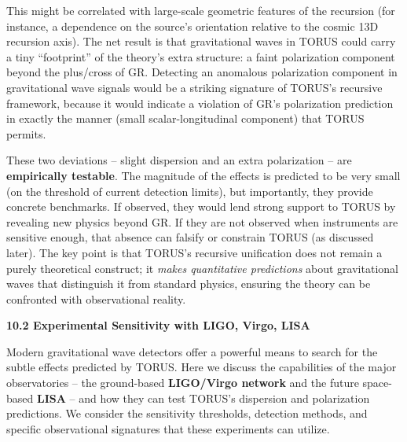 \documentclass[
]{article}
\begin{document}
{\begin{itemize}
  This might be correlated with large-scale geometric features of the
  recursion (for instance, a dependence on the source's orientation
  relative to the cosmic 13D recursion axis)\hspace{0pt}. The net result
  is that gravitational waves in TORUS could carry a tiny ``footprint''
  of the theory's extra structure: a faint polarization component beyond
  the plus/cross of GR. Detecting an anomalous polarization component in
  gravitational wave signals would be a striking signature of TORUS's
  recursive framework, because it would indicate a violation of GR's
  polarization prediction in exactly the manner (small
  scalar-longitudinal component) that TORUS permits\hspace{0pt}.
\end{itemize}

These two deviations -- slight dispersion and an extra polarization --
are \textbf{empirically testable}. The magnitude of the effects is
predicted to be very small (on the threshold of current detection
limits), but importantly, they provide concrete benchmarks. If observed,
they would lend strong support to TORUS by revealing new physics beyond
GR. If they are not observed when instruments are sensitive enough, that
absence can falsify or constrain TORUS (as discussed later). The key
point is that TORUS's recursive unification does not remain a purely
theoretical construct; it \emph{makes quantitative predictions} about
gravitational waves that distinguish it from standard physics, ensuring
the theory can be confronted with observational reality\hspace{0pt}.

\textbf{10.2 Experimental Sensitivity with LIGO, Virgo, LISA}

Modern gravitational wave detectors offer a powerful means to search for
the subtle effects predicted by TORUS. Here we discuss the capabilities
of the major observatories -- the ground-based \textbf{LIGO/Virgo
network} and the future space-based \textbf{LISA} -- and how they can
test TORUS's dispersion and polarization predictions. We consider the
sensitivity thresholds, detection methods, and specific observational
signatures that these experiments can utilize.

}
\end{document}
